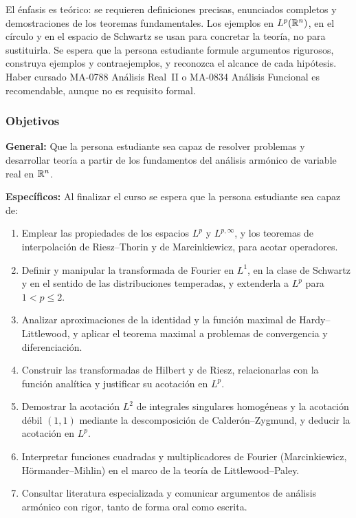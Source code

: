 \begin{refsection}
El énfasis es teórico: se requieren definiciones precisas, enunciados completos y demostraciones de los teoremas fundamentales. Los ejemplos en $L^p(\mathbb{R}^n)$, en el círculo y en el espacio de Schwartz se usan para concretar la teoría, no para sustituirla. Se espera que la persona estudiante formule argumentos rigurosos, construya ejemplos y contraejemplos, y reconozca el alcance de cada hipótesis. Haber cursado MA-0788 Análisis Real~II o MA-0834 Análisis Funcional es recomendable, aunque no es requisito formal.

\subsubsection*{Objetivos}

\textbf{General:} Que la persona estudiante sea capaz de resolver problemas y desarrollar teoría a partir de los fundamentos del análisis armónico de variable real en $\mathbb{R}^n$.

\textbf{Específicos:} Al finalizar el curso se espera que la persona estudiante sea capaz de:

\begin{enumerate}
\item Emplear las propiedades de los espacios $L^p$ y $L^{p,\infty}$, y los teoremas de interpolación de Riesz--Thorin y de Marcinkiewicz, para acotar operadores.
\item Definir y manipular la transformada de Fourier en $L^1$, en la clase de Schwartz y en el sentido de las distribuciones temperadas, y extenderla a $L^p$ para $1<p\le 2$.
\item Analizar aproximaciones de la identidad y la función maximal de Hardy--Littlewood, y aplicar el teorema maximal a problemas de convergencia y diferenciación.
\item Construir las transformadas de Hilbert y de Riesz, relacionarlas con la función analítica y justificar su acotación en $L^p$.
\item Demostrar la acotación $L^2$ de integrales singulares homogéneas y la acotación débil $(1,1)$ mediante la descomposición de Calderón--Zygmund, y deducir la acotación en $L^p$.
\item Interpretar funciones cuadradas y multiplicadores de Fourier (Marcinkiewicz, Hörmander--Mihlin) en el marco de la teoría de Littlewood--Paley.
\item Consultar literatura especializada y comunicar argumentos de análisis armónico con rigor, tanto de forma oral como escrita.
\end{enumerate}


\end{refsection}
